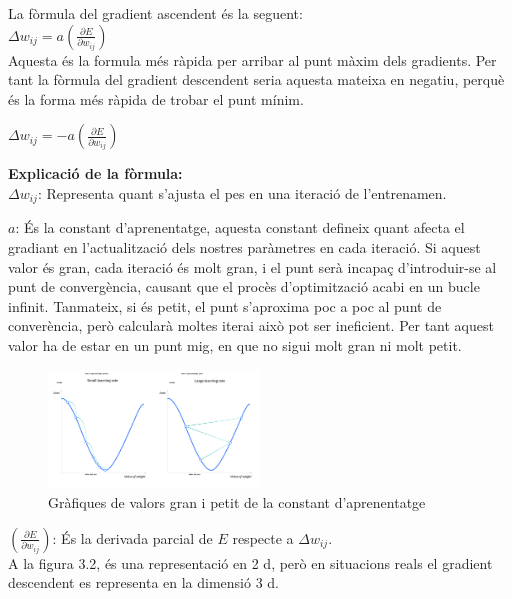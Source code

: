 \begin{enumerate}
\begin{itemize}
          La fòrmula del gradient ascendent és la seguent: \\

          $\Delta w_{ij} = a \left( \frac{\partial E}{\partial w_{ij}} \right)$ \\

          Aquesta és la formula més ràpida per arribar al punt màxim dels gradients. Per tant la fòrmula del gradient descendent seria aquesta mateixa en negatiu, perquè és la forma més ràpida de trobar el punt mínim.

          $\Delta w_{ij} = -a \left( \frac{\partial E}{\partial w_{ij}} \right)$

          \textbf{Explicació de la fòrmula:}\\
           $\Delta w_{ij}$: Representa quant s'ajusta el pes en una iteració de l'entrenamen.

           $a$: És la constant d'aprenentatge, aquesta constant defineix quant afecta el gradiant en l'actualització dels nostres paràmetres en cada iteració. Si aquest valor és gran, cada iteració és molt gran, i el punt serà incapaç d'introduir-se al punt de convergència, causant que el procès d'optimització acabi en un bucle infinit. Tanmateix, si és petit, el punt s'aproxima poc a poc al punt de converència, però calcularà moltes iterai això pot ser ineficient. Per tant aquest valor ha de estar en un punt mig, en que no sigui molt gran ni molt petit.

           \begin{figure}[H]
           \centering
           \includegraphics[width=0.5\textwidth]{./figures/constant_gradient.png}
             \caption{Gràfiques de valors gran i petit de la constant d'aprenentatge}
            \end{figure}


           $\left( \frac{\partial E}{\partial w_{ij}} \right)$: És la derivada parcial de $E$ respecte a $\Delta w_{ij}$. \\

           A la figura 3.2, és una representació en 2 d, però en situacions reals el gradient descendent es representa en la dimensió 3 d.



\end{itemize}
\end{enumerate}

